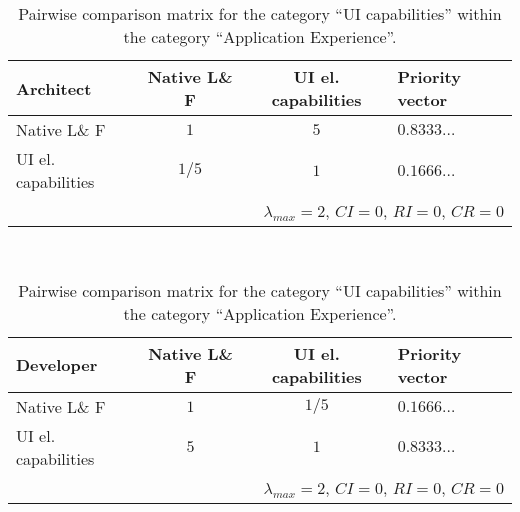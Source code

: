 \begin{table}[h]
    \begin{center}
        \begin{tabular}{lccl}
            \hline
            \textbf{Architect}  & Native L\& F & UI el. capabilities & Priority vector \\
            \hline
            Native L\& F        & $1$          & $5$                 & $0.8333\ldots$  \\
            UI el. capabilities & $1/5$        & $1$                 & $0.1666\ldots$  \\
            \hline
            \multicolumn{4}{r}{$\lambda_{max} = 2$, $CI = 0$, $RI = 0$, $CR = 0$}      \\
            \hline
        \end{tabular}
        \\\vspace{1em}
        \begin{tabular}{lccl}
            \hline
            \textbf{Developer}  & Native L\& F & UI el. capabilities & Priority vector \\
            \hline
            Native L\& F        & $1$          & $1/5$               & $0.1666\ldots$  \\
            UI el. capabilities & $5$          & $1$                 & $0.8333\ldots$  \\
            \hline
            \multicolumn{4}{r}{$\lambda_{max} = 2$, $CI = 0$, $RI = 0$, $CR = 0$}      \\
            \hline
        \end{tabular}
        \caption{Pairwise comparison matrix for the category ``UI capabilities'' within the category ``Application Experience''.}
        \label{tab:ui}
    \end{center}
\end{table}

